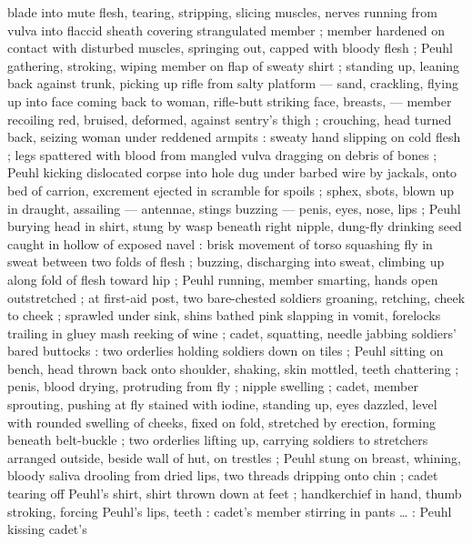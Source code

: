 blade into mute flesh, tearing, %
stripping, slicing muscles, nerves running from vulva into flaccid sheath covering strangulated
member ; member hardened on contact with disturbed muscles, springing out, capped with bloody flesh
; Peuhl gathering, stroking, wiping member on flap of sweaty shirt ; standing up, leaning back
against trunk, picking up rifle from salty platform --- sand, crackling, flying up into face
{\dashcom} coming back to woman, rifle-butt striking face, breasts, --- member recoiling red,
bruised, deformed, against sentry's thigh ; crouching, head turned back, seizing woman under
reddened armpits : sweaty hand slipping on cold flesh ; legs spattered with blood from mangled vulva
dragging on debris of bones ; Peuhl kicking dislocated corpse into hole dug under barbed wire by
jackals, onto bed of carrion, excrement ejected in scramble for spoils ; sphex, sbots, blown up in
draught, assailing --- antennae, stings buzzing --- penis, eyes, nose, lips ; Peuhl burying head in
shirt, stung by wasp beneath right nipple, dung-fly drinking seed caught in hollow of exposed navel
: brisk movement of torso squashing fly in sweat between two folds of flesh ; buzzing, discharging
into sweat, climbing up along fold of flesh toward hip ; Peuhl running, member smarting, hands open
outstretched ; at first-aid post, two bare-chested soldiers groaning, retching, cheek to cheek ;
sprawled under sink, shins bathed pink slapping in vomit, forelocks trailing in gluey mash reeking
of wine ; cadet, squatting, needle jabbing soldiers' bared buttocks : two orderlies holding soldiers
down on tiles ; Peuhl sitting on bench, head thrown back onto shoulder, shaking, skin mottled, teeth
chattering ; penis, blood drying, protruding from fly ; nipple swelling ; cadet, member sprouting,
pushing at fly stained with iodine, standing up, eyes dazzled, level with rounded swelling of
cheeks, fixed on fold, stretched by erection, forming beneath belt-buckle ; two orderlies lifting
up, carrying soldiers to stretchers arranged outside, beside wall of hut, on trestles ; Peuhl stung
on breast, whining, bloody saliva drooling from dried lips, two threads dripping onto chin ; cadet
tearing off Peuhl's shirt, shirt thrown down at feet ; handkerchief in hand, thumb stroking, forcing
Peuhl's lips, teeth : %
cadet's member stirring in pants {\ldots}  : Peuhl kissing cadet's
